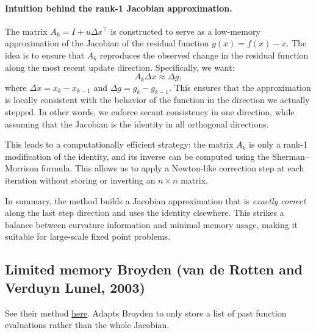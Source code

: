 \documentclass[a4paper,12pt]{article}
\begin{document}
\paragraph{Intuition behind the rank-1 Jacobian approximation.}
The matrix \( A_k = I + u \Delta x^\top \) is constructed to serve as a low-memory approximation of the Jacobian of the residual function \( g(x) = f(x) - x \). The idea is to ensure that \( A_k \) reproduces the observed change in the residual function along the most recent update direction. Specifically, we want:
\[
A_k \Delta x \approx \Delta g,
\]
where \( \Delta x = x_k - x_{k-1} \) and \( \Delta g = g_k - g_{k-1} \). This ensures that the approximation is locally consistent with the behavior of the function in the direction we actually stepped. In other words, we enforce secant consistency in one direction, while assuming that the Jacobian is the identity in all orthogonal directions.

This leads to a computationally efficient strategy: the matrix \( A_k \) is only a rank-1 modification of the identity, and its inverse can be computed using the Sherman--Morrison formula. This allows us to apply a Newton-like correction step at each iteration without storing or inverting an \( n \times n \) matrix.

In summary, the method builds a Jacobian approximation that is \emph{exactly correct} along the last step direction and uses the identity elsewhere. This strikes a balance between curvature information and minimal memory usage, making it suitable for large-scale fixed point problems.


\subsection{Limited memory Broyden (van de Rotten and Verduyn Lunel, 2003)}

See their method \href{https://math.leidenuniv.nl/reports/files/2003-06.pdf}{here}. Adapts Broyden to only store a list of past function evaluations rather than the whole Jacobian. 
\end{document}
